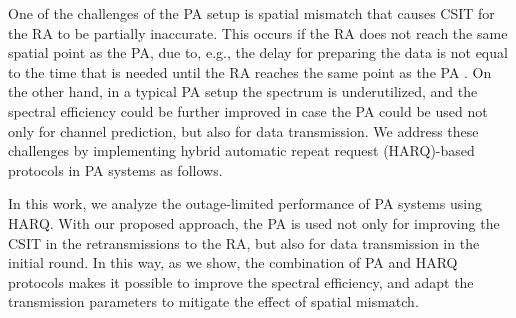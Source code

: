 One of the challenges of the PA setup is spatial mismatch that  causes CSIT for the RA to be partially inaccurate. This occurs if the RA does not reach the same spatial point as the PA, due to, e.g.,  the delay for preparing the data  is not equal to the time that is needed until the RA reaches the same point as the PA \cite{Dinh2013ICCVEadaptive}.  On the other hand, in a typical PA setup the spectrum  is underutilized, and the spectral efficiency could be further improved in case the PA could be used not only for channel  prediction, but also for data transmission. We address these challenges by implementing hybrid automatic repeat request (HARQ)-based protocols in PA systems as follows.



In this work, we analyze the outage-limited performance of PA systems using HARQ.   With our proposed approach, the PA is used not only for improving the CSIT in the retransmissions to the RA, but also for data transmission in the initial round. In this way, as we show,  the combination of PA and HARQ protocols makes it possible to improve the spectral efficiency, and adapt the transmission parameters to mitigate the effect of spatial mismatch.

